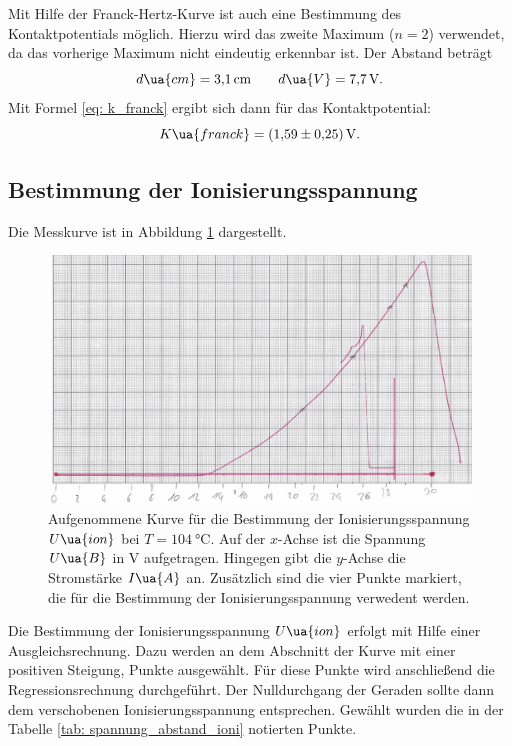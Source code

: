 Mit Hilfe der Franck-Hertz-Kurve ist auch eine Bestimmung des Kontaktpotentials
möglich. Hierzu wird das zweite Maximum ($n=2$) verwendet, da das vorherige Maximum %
nicht eindeutig erkennbar ist. Der Abstand beträgt
\begin{equation*}
  d\ua{cm}=\SI{3.1}{\centi\meter} \qquad d\ua{V}=\SI{7.7}{\volt}.
\end{equation*}
Mit Formel \eqref{eq: k_franck} ergibt sich dann für das Kontaktpotential:
\begin{equation}
  \label{eq:k_frank}
  K\ua{franck}= \SI{1.59\pm0.25}{\volt}.
\end{equation}
\FloatBarrier
\subsection{Bestimmung der Ionisierungsspannung}\label{sec:ioni}
\FloatBarrier
Die Messkurve ist in Abbildung \ref{fig: messkurve_ioni} dargestellt.
\begin{figure}
  \centering
  \includegraphics[width=0.8 \textwidth]{./pics/ionisierungsenergie.png}
  \caption{Aufgenommene Kurve für die Bestimmung der Ionisierungsspannung $U\ua{ion}$ bei $T=\SI{104}{\celsius}$. Auf der $x$-Achse ist die Spannung $U\ua{B}$ in $\si{\volt}$ aufgetragen.
          Hingegen gibt die $y$-Achse die Stromstärke $I\ua{A}$ an. Zusätzlich sind die vier Punkte markiert, die für die Bestimmung der Ionisierungsspannung verwedent werden.}
  \label{fig: messkurve_ioni}
\end{figure}
Die Bestimmung der Ionisierungsspannung $U\ua{ion}$ erfolgt mit Hilfe einer Ausgleichsrechnung. Dazu werden an dem Abschnitt der Kurve mit einer positiven Steigung,
Punkte ausgewählt. Für diese Punkte wird anschließend die Regressionsrechnung durchgeführt.
Der Nulldurchgang der Geraden sollte dann dem verschobenen Ionisierungsspannung entsprechen.
Gewählt wurden die in der Tabelle \ref{tab: spannung_abstand_ioni} notierten Punkte.
